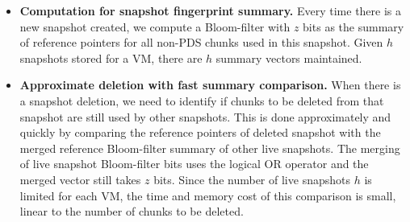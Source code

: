 \begin{itemize}
\item {\bf Computation for snapshot fingerprint summary.}
Every time there is a new snapshot created,
we compute a Bloom-filter with $z$ bits as the summary of reference pointers for all non-PDS chunks used 
in this snapshot. Given $h$ snapshots stored for a VM, there are $h$ summary vectors maintained.



\item {\bf Approximate deletion with fast summary comparison.}
When there is a snapshot deletion,  
we need to identify if  chunks to be deleted from that snapshot
are still used by other snapshots. 
This is done approximately and quickly by comparing the 
reference pointers of deleted snapshot with
the merged reference Bloom-filter summary of other live snapshots.
The merging of live snapshot Bloom-filter bits uses the logical OR operator 
and the merged vector still takes $z$ bits.
Since the number of live snapshots $h$ is limited for
each VM, 
the time and memory cost of this comparison is small, linear to the number of chunks to be deleted.


\end{itemize}
